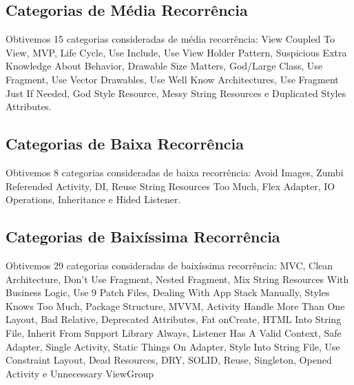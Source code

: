 \subsection{Categorias de M\'edia Recorr\^encia}
Obtivemos 15 categorias consideradas de m\'edia recorr\^encia: View Coupled To View, MVP, Life Cycle, Use Include, Use View Holder Pattern, Suspicious Extra Knowledge About Behavior, Drawable Size Matters, God/Large Class, Use Fragment, Use Vector Drawables, Use Well Know Architectures, Use Fragment Just If Needed, God Style Resource, Messy String Resources e Duplicated Styles Attributes.



\subsection{Categorias de Baixa Recorr\^encia}
Obtivemos 8 categorias consideradas de baixa recorr\^encia: Avoid Images, Zumbi Referended Activity, DI, Reuse String Resources Too Much, Flex Adapter, IO Operations, Inheritance e Hided Listener.


\subsection{Categorias de Baix\'issima Recorr\^encia}
Obtivemos 29 categorias consideradas de baix\'issima recorr\^encia: MVC, Clean Architecture, Don't Use Fragment, Nested Fragment, Mix String Resources With Business Logic, Use 9 Patch Files, Dealing With App Stack Manually, Styles Knows Too Much, Package Structure, MVVM, Activity Handle More Than One Layout, Bad Relative, Deprecated Attributes, Fat onCreate, HTML Into String File, Inherit From Support Library Always, Listener Has A Valid Context, Safe Adapter, Single Activity, Static Things On Adapter, Style Into String File, Use Constraint Layout, Dead Resources, DRY, SOLID, Reuse, Singleton, Opened Activity e Unnecessary ViewGroup








